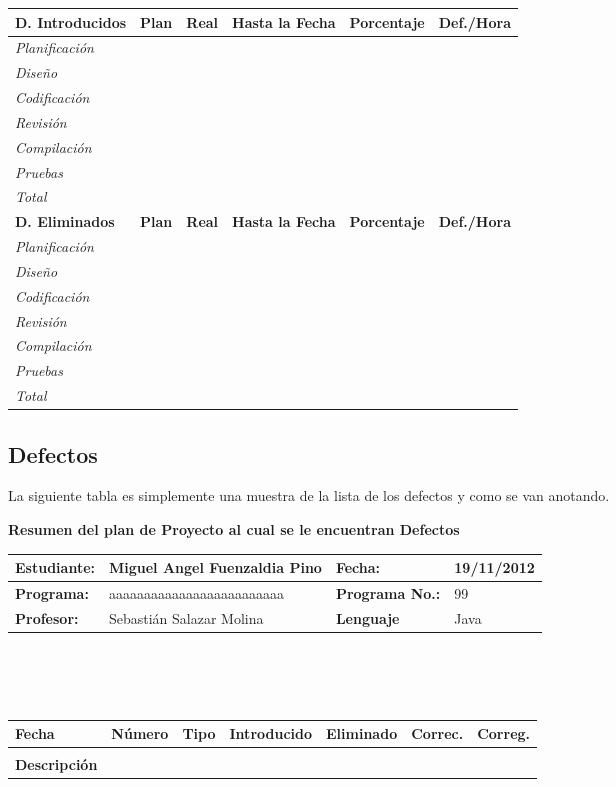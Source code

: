 \documentclass[a4paper,12pt,openany,oneside]{book}
\begin{document}
\newpage
\begin{tabular}{| l | l | l | l | l | l |}
\hline
\textbf{D. Introducidos} & \textbf{Plan} & \textbf{Real} & \textbf{Hasta la Fecha} & \textbf{Porcentaje} & \textbf{Def./Hora} \\
\hline
\textit{Planificación} & & & & & \\
\hline
\textit{Diseño} & & & & & \\
\hline
\textit{Codificación} & & & & & \\
\hline
\textit{Revisión} & & & & & \\
\hline
\textit{Compilación} & & & & & \\
\hline
\textit{Pruebas} & & & & & \\
\hline
\textit{Total} & & & & & \\
\hline
\textbf{D. Eliminados} & \textbf{Plan} & \textbf{Real} & \textbf{Hasta la Fecha} & \textbf{Porcentaje} & \textbf{Def./Hora} \\
\hline
\textit{Planificación} & & & & & \\
\hline
\textit{Diseño} & & & & & \\
\hline
\textit{Codificación} & & & & & \\
\hline
\textit{Revisión} & & & & & \\
\hline
\textit{Compilación} & & & & & \\
\hline
\textit{Pruebas} & & & & & \\
\hline
\textit{Total} & & & & & \\
\hline
\end{tabular}
\subsection{Defectos}
La siguiente tabla es simplemente una muestra de la lista de los defectos y como se van anotando.

\textbf{Resumen del plan de Proyecto al cual se le encuentran Defectos}\\
\begin{tabular}{| l | l | l | l |}
\hline
\textbf{Estudiante:} & Miguel Angel Fuenzaldia Pino & \textbf{Fecha:} & 19/11/2012\\
\hline
\textbf{Programa:} & aaaaaaaaaaaaaaaaaaaaaaaaa & \textbf{Programa No.:} & 99\\
\hline
\textbf{Profesor:} & Sebastián Salazar Molina & \textbf{Lenguaje} & Java  \\
\hline
\end{tabular}
\\\\\\
\begin{tabular}{| l | l | l | l | l | l | l |}
\hline
\textbf{Fecha} & \textbf{Número} & \textbf{Tipo} & \textbf{Introducido} & \textbf{Eliminado} & \textbf{Correc.} & \textbf{Correg.}\\
\hline
 & & & & & & \\
\hline
\textbf{Descripción} & \multicolumn{6}{|c|}{} \\
\hline
\end{tabular}
\end{document}
